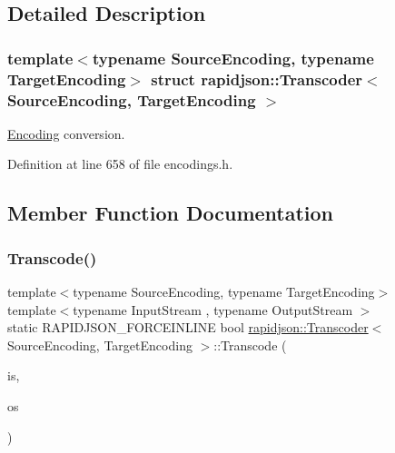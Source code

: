 \subsection{Detailed Description}
\subsubsection*{template$<$typename Source\+Encoding, typename Target\+Encoding$>$\newline
struct rapidjson\+::\+Transcoder$<$ Source\+Encoding, Target\+Encoding $>$}

\mbox{\hyperlink{classrapidjson_1_1_encoding}{Encoding}} conversion. 

Definition at line 658 of file encodings.\+h.



\subsection{Member Function Documentation}
\mbox{\label{structrapidjson_1_1_transcoder_a3a1de7069d3cf7f1d4f4e2f96ceb7664}} 
\subsubsection{\texorpdfstring{Transcode()}{Transcode()}}
{\footnotesize\ttfamily template$<$typename Source\+Encoding, typename Target\+Encoding$>$ \\
template$<$typename Input\+Stream , typename Output\+Stream $>$ \\
static R\+A\+P\+I\+D\+J\+S\+O\+N\+\_\+\+F\+O\+R\+C\+E\+I\+N\+L\+I\+NE bool \mbox{\hyperlink{structrapidjson_1_1_transcoder}{rapidjson\+::\+Transcoder}}$<$ Source\+Encoding, Target\+Encoding $>$\+::Transcode (\begin{DoxyParamCaption}\item[{Input\+Stream \&}]{is,  }\item[{Output\+Stream \&}]{os }\end{DoxyParamCaption})\hspace{0.3cm}{\ttfamily [static]}}




